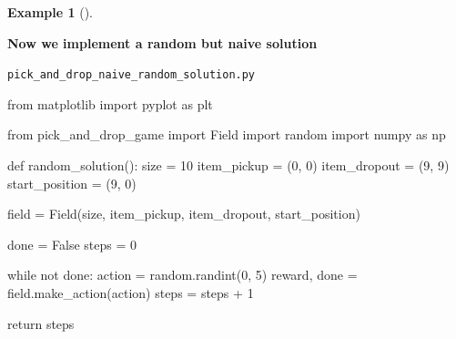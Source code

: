 \documentclass[
  letterpaper,
]{krantz}
\makeatletter
\newenvironment{Shaded}{\begin{snugshade}}{\end{snugshade}}
\newcommand{\ControlFlowTok}[1]{\textcolor[rgb]{0.00,0.23,0.31}{#1}}
\newcommand{\DecValTok}[1]{\textcolor[rgb]{0.68,0.00,0.00}{#1}}
\newcommand{\ImportTok}[1]{\textcolor[rgb]{0.00,0.46,0.62}{#1}}
\newcommand{\KeywordTok}[1]{\textcolor[rgb]{0.00,0.23,0.31}{#1}}
\newcommand{\NormalTok}[1]{\textcolor[rgb]{0.00,0.23,0.31}{#1}}
\newcommand{\OperatorTok}[1]{\textcolor[rgb]{0.37,0.37,0.37}{#1}}
\newcommand{\VariableTok}[1]{\textcolor[rgb]{0.07,0.07,0.07}{#1}}
\newenvironment{kframe}{%
\medskip{}
\setlength{\fboxsep}{.8em}
 \def\at@end@of@kframe{}%
 \ifinner\ifhmode%
  \def\at@end@of@kframe{\end{minipage}}%
  \begin{minipage}{\columnwidth}%
 \fi\fi%
 \def\FrameCommand##1{\hskip\@totalleftmargin \hskip-\fboxsep
 \colorbox{shadecolor}{##1}\hskip-\fboxsep
     \hskip-\linewidth \hskip-\@totalleftmargin \hskip\columnwidth}%
 \MakeFramed {\advance\hsize-\width
   \@totalleftmargin\z@ \linewidth\hsize
   \@setminipage}}%
 {\par\unskip\endMakeFramed%
 \at@end@of@kframe}
\renewenvironment{Shaded}{\begin{kframe}}{\end{kframe}}
\theoremstyle{plain}
\theoremstyle{definition}
\newtheorem{example}{Example}[chapter]
\theoremstyle{definition}
\theoremstyle{remark}
\makeatother
\begin{document}
\begin{example}[]
\begin{tcolorbox}[enhanced jigsaw, bottomrule=.15mm, opacityback=0, breakable, colframe=quarto-callout-tip-color-frame, left=2mm, rightrule=.15mm, toprule=.15mm, leftrule=.75mm, arc=.35mm, colback=white]
\vspace{-3mm}\textbf{Now we implement a random but naive solution}\vspace{3mm}

\begin{codelisting}[H]

\caption{\texttt{pick\_and\_drop\_naive\_random\_solution.py}}

\begin{Shaded}
\begin{Highlighting}[]
\ImportTok{from}\NormalTok{ matplotlib }\ImportTok{import}\NormalTok{ pyplot }\ImportTok{as}\NormalTok{ plt}

\ImportTok{from}\NormalTok{ pick\_and\_drop\_game }\ImportTok{import}\NormalTok{ Field}
\ImportTok{import}\NormalTok{ random}
\ImportTok{import}\NormalTok{ numpy }\ImportTok{as}\NormalTok{ np}


\KeywordTok{def}\NormalTok{ random\_solution():}
\NormalTok{    size }\OperatorTok{=} \DecValTok{10}
\NormalTok{    item\_pickup }\OperatorTok{=}\NormalTok{ (}\DecValTok{0}\NormalTok{, }\DecValTok{0}\NormalTok{)}
\NormalTok{    item\_dropout }\OperatorTok{=}\NormalTok{ (}\DecValTok{9}\NormalTok{, }\DecValTok{9}\NormalTok{)}
\NormalTok{    start\_position }\OperatorTok{=}\NormalTok{ (}\DecValTok{9}\NormalTok{, }\DecValTok{0}\NormalTok{)}
    
\NormalTok{    field }\OperatorTok{=}\NormalTok{ Field(size, item\_pickup, item\_dropout, start\_position)}
    
\NormalTok{    done }\OperatorTok{=} \VariableTok{False}
\NormalTok{    steps }\OperatorTok{=} \DecValTok{0}
    
    \ControlFlowTok{while} \KeywordTok{not}\NormalTok{ done:}
\NormalTok{        action }\OperatorTok{=}\NormalTok{ random.randint(}\DecValTok{0}\NormalTok{, }\DecValTok{5}\NormalTok{)}
\NormalTok{        reward, done }\OperatorTok{=}\NormalTok{ field.make\_action(action)}
\NormalTok{        steps }\OperatorTok{=}\NormalTok{ steps }\OperatorTok{+} \DecValTok{1}
    
    \ControlFlowTok{return}\NormalTok{ steps}



\end{Highlighting}
\end{Shaded}
\end{codelisting}
\end{tcolorbox}
\end{example}
\end{document}
